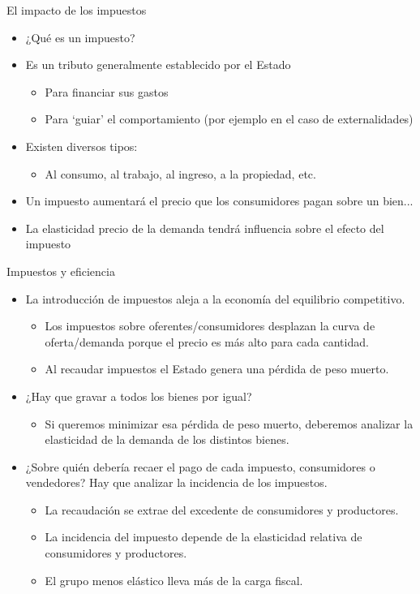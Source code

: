 \documentclass{beamer}
\begin{document}
\begin{frame}{El impacto de los impuestos}
    \begin{itemize}
        \item ¿Qué es un impuesto?
        \item Es un tributo generalmente establecido por el Estado
        \begin{itemize}
            \item Para financiar sus gastos
            \item Para ‘guiar’ el comportamiento (por ejemplo en el caso de externalidades)
        \end{itemize}
        \item Existen diversos tipos:
        \begin{itemize}
            \item Al consumo, al trabajo, al ingreso, a la propiedad, etc.
        \end{itemize}
        \item Un impuesto aumentará el precio que los consumidores pagan sobre un bien...
        \item La elasticidad precio de la demanda tendrá influencia sobre el efecto del impuesto
    \end{itemize}
\end{frame}

\begin{frame}{Impuestos y eficiencia}
    \begin{itemize}
        \item La introducción de impuestos aleja a la economía del equilibrio competitivo. 
        \begin{itemize}
            \item Los impuestos sobre oferentes/consumidores desplazan la curva de oferta/demanda porque el precio es más alto para cada cantidad.
            \item Al recaudar impuestos el Estado genera una pérdida de peso muerto. 
        \end{itemize}
        \item ¿Hay que gravar a todos los bienes por igual?
        \begin{itemize}
            \item Si queremos minimizar esa pérdida de peso muerto, deberemos analizar la elasticidad de la demanda de los distintos bienes.
        \end{itemize}
        \item  ¿Sobre quién debería recaer el pago de cada impuesto, consumidores o vendedores? Hay que analizar la incidencia de los impuestos.
        \begin{itemize}
            \item La recaudación se extrae del excedente de consumidores y productores.
            \item La incidencia del impuesto depende de la elasticidad relativa de consumidores y productores.
            \item El grupo menos elástico lleva más de la carga fiscal. 
        \end{itemize}
    \end{itemize}
\end{frame}
\end{document}
